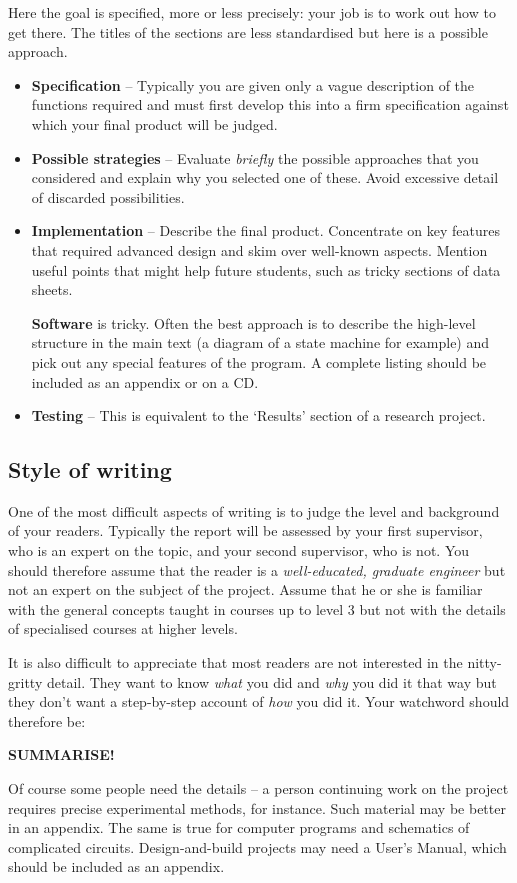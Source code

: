 Here the goal is specified, more or less precisely: your job is to work out how to get there. The titles of the sections are less standardised but here is a possible approach.
\begin{itemize}
\item
\textbf{Specification} --
Typically you are given only a vague description of the functions required and must first develop this into a firm specification against which your final product will be judged.
\item
\textbf{Possible strategies} --
Evaluate \emph{briefly} the possible approaches that you considered 
and explain why you selected one of these. 
Avoid excessive detail of discarded possibilities.
\item
\textbf{Implementation} --
Describe the final product. Concentrate on key features that required advanced design and skim over well-known aspects. Mention useful points that might help future students, such as tricky sections of data sheets.

\textbf{Software} is tricky. Often the best approach is to describe the high-level structure in the main text (a diagram of a state machine for example) and pick out any special features of the program. A complete listing should be included as an appendix or on a CD.
\item
\textbf{Testing} --
This is equivalent to the `Results' section of a research project. 
\end{itemize}


\subsection{Style of writing}

One of the most difficult aspects of writing is to judge the level and background of your readers. Typically the report will be assessed by your first supervisor, who is an expert on the topic, and your second supervisor, who is not. You should therefore assume that the reader is a \emph{well-educated, graduate engineer} but not an expert on the subject of the project. Assume that he or she is familiar with the general concepts taught in courses up to level 3 but not with the details of specialised courses at higher levels.

It is also difficult to appreciate that most readers are not interested in the nitty-gritty detail. They want to know \emph{what} you did and \emph{why} you did it that way but they don't want a step-by-step account of \emph{how} you did it. Your watchword should therefore be:
\begin{center}
\textbf{SUMMARISE!}
\end{center}
Of course some people need the details -- a person continuing work on the project requires precise experimental methods, for instance. Such material may be better in an appendix. The same is true for computer programs and schematics of complicated circuits. Design-and-build projects may need a User's Manual, which should be included as an appendix. 

